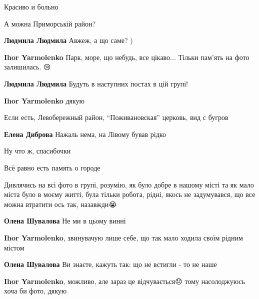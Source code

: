 
Красиво и больно


А можна Приморській район?

\begin{itemize} %
\textbf{Людмила Людмила} Авжеж, а що саме? )

\textbf{Ihor Yarmolenko} Парк, море, що небудь, все цікаво... Тільки пам'ять на фото залишилась. 😢

\begin{itemize} %
\textbf{Людмила Людмила} Будуть в наступних постах в цій групі!
\end{itemize} %

\textbf{Ihor Yarmolenko} дякую 🤗

\end{itemize} %


Если есть, Левобережный район, \enquote{Поживановская} церковь, вид с бугров🙂

\begin{itemize} %
\textbf{Елена Диброва} Нажаль нема, на Лівому бував рідко 🙁


Ну что ж, спасибочки

Всё равно есть память о городе🙂
\end{itemize} %


Дивлячись на всі фото в групі, розумію, як було добре в нашому місті та як мало
міста було в моєму житті, була тільки робота, рідні, якось не задумувався, що
все можна втратити ось так, назавжди😭

\begin{itemize} %
\textbf{Олена Шувалова} Не ми в цьому винні

\begin{itemize} %
\textbf{Ihor Yarmolenko}, звинувачую лише себе, що так мало ходила своїм рідним містом

\textbf{Олена Шувалова} Ви знаєте, кажуть так: що не встигли - то не наше

\textbf{Ihor Yarmolenko}, можливо, але зараз це відчувається😞 тому насолоджуюсь хоча би фото, дякую
\end{itemize} %

\end{itemize} %

